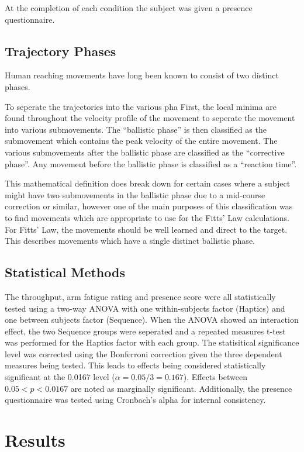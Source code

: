 At the completion of each condition the subject was given a presence questionnaire.

\subsection{Trajectory Phases}

Human reaching movements have long been known to consist of two distinct phases\cite{woodward_1899}.

To seperate the trajectories into the various pha
First, the local minima are found throughout the velocity profile of the movement to seperate the movement into various submovements.
The ``ballistic phase'' is then classified as the submovement which contains the peak velocity of the entire movement.
The various submovements after the ballistic phase are classified as the ``corrective phase''.
Any movement before the ballistic phase is classified as a ``reaction time''.

This mathematical definition does break down for certain cases where a subject might have two submovements in the ballistic phase due to a mid-course correction or similar, however one of the main purposes of this classification was to find movements which are appropriate to use for the Fitts' Law calculations.
For Fitts' Law, the movements should be well learned and direct to the target.
This describes movements which have a single distinct ballistic phase.

\subsection{Statistical Methods}

The throughput, arm fatigue rating and presence score were all statistically tested using a two-way ANOVA with one within-subjects factor (Haptics) and one between subjects factor (Sequence).
When the ANOVA showed an interaction effect, the two Sequence groups were seperated and a repeated measures t-test was performed for the Haptics factor with each group.
The statisitical significance level was corrected using the Bonferroni correction given the three dependent measures being tested.
This leads to effects being considered statistically significant at the 0.0167 level ($\alpha=0.05/3=0.167$).
Effects between $0.05 < p < 0.0167$ are noted as marginally significant.
Additionally, the presence questionnaire was tested using Cronbach's alpha for internal consistency.

\section{Results}

